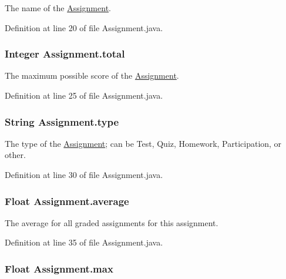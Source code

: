The name of the \hyperlink{classAssignment}{Assignment}. 



Definition at line 20 of file Assignment.java.\hypertarget{classAssignment_b1d959bf57209d29038de35778662b3c}{
\subsubsection{\setlength{\rightskip}{0pt plus 5cm}Integer {\bf Assignment.total}}}
\label{classAssignment_b1d959bf57209d29038de35778662b3c}


The maximum possible score of the \hyperlink{classAssignment}{Assignment}. 



Definition at line 25 of file Assignment.java.\hypertarget{classAssignment_6315f69bacfc69c4328db4113801b27f}{
\subsubsection{\setlength{\rightskip}{0pt plus 5cm}String {\bf Assignment.type}}}
\label{classAssignment_6315f69bacfc69c4328db4113801b27f}


The type of the \hyperlink{classAssignment}{Assignment}; can be Test, Quiz, Homework, Participation, or other. 



Definition at line 30 of file Assignment.java.\hypertarget{classAssignment_ce710f4a8ac6b50cc6765e6b7ab9c1f0}{
\subsubsection{\setlength{\rightskip}{0pt plus 5cm}Float {\bf Assignment.average}}}
\label{classAssignment_ce710f4a8ac6b50cc6765e6b7ab9c1f0}


The average for all graded assignments for this assignment. 



Definition at line 35 of file Assignment.java.\hypertarget{classAssignment_4ed2fd5e6b8df438191e5094bc0073b8}{
\subsubsection{\setlength{\rightskip}{0pt plus 5cm}Float {\bf Assignment.max}}}
\label{classAssignment_4ed2fd5e6b8df438191e5094bc0073b8}


